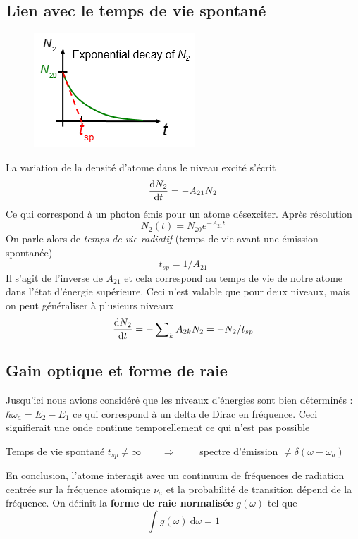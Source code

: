 	\subsection{Lien avec le temps de vie spontané}
	\begin{figure}
	\vspace{-5mm}
	\includegraphics[scale=0.75]{ch2/image12.png}
	\end{figure}
	La variation de la densité d'atome dans le niveau excité s'écrit
	\begin{equation}
	\frac{{{\rm{d}}{N_2}}}{{{\rm{d}}t}} =  - {A_{21}}{N_2}
	\end{equation}
	Ce qui correspond à un photon émis pour un atome désexciter. Après résolution
	\begin{equation}
	{N_2}(t) = {N_{20}}{e^{ - {A_{21}}t}}
	\end{equation}
	On parle alors de \textit{temps de vie radiatif} (temps de vie avant une émission spontanée)
	\begin{equation}
	t_{sp} = 1/A_{21}
	\end{equation}
	Il s'agit de l'inverse de $A_{21}$ et cela correspond au temps de vie de notre atome dans 
	l'état d'énergie supérieure. Ceci n'est valable que pour deux niveaux, mais on peut 
	généraliser à plusieurs niveaux
	\begin{equation}
	\frac{{{\rm{d}}{N_2}}}{{{\rm{d}}t}} =  - \sum\nolimits_k {{A_{2k}}} {N_2} =  - {N_2}/{t_{sp}}
	\end{equation}
	
	\subsection{Gain optique et forme de raie}
	Jusqu'ici nous avions considéré que les niveaux d'énergies sont bien déterminés : $\hbar
	\omega_a = E_2-E_1$ ce qui correspond à un delta de Dirac en fréquence. Ceci signifierait une 
	onde continue temporellement ce qui n'est pas possible
	\begin{center}
	Temps de vie spontané $t_{sp}\neq \infty\qquad\Rightarrow\qquad$ spectre d'émission $\neq 
	\delta(\omega-\omega_a)$
	\end{center}
	En conclusion, l'atome interagit avec un continuum de fréquences de radiation centrée 
	sur la fréquence atomique $\nu_a$ et la probabilité de transition dépend de la fréquence. On 
	définit la \textbf{forme de raie normalisée} $g(\omega)$ tel que
	\begin{equation}
	\int g(\omega)\ \text{d}\omega = 1
	\end{equation}
		
